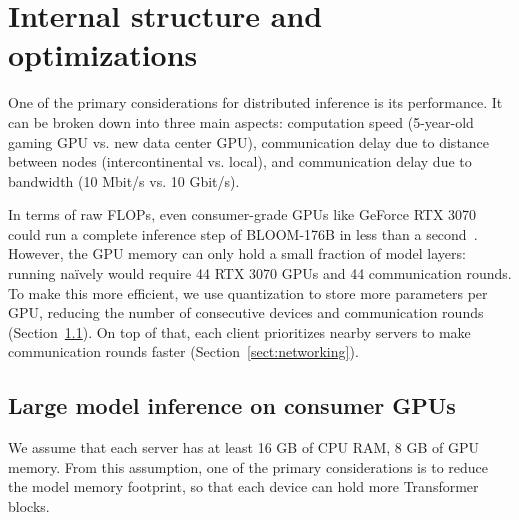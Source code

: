 \section{Internal structure and optimizations}\label{sect:internals}


One of the primary considerations for distributed inference is its performance. It can be broken down into three main aspects: computation speed (5-year-old gaming GPU vs. new data center GPU), communication delay due to distance between nodes (intercontinental vs. local), and communication delay due to bandwidth (10 Mbit/s vs. 10 Gbit/s).

In terms of raw FLOPs, even consumer-grade GPUs like GeForce RTX 3070 could run a complete inference step of BLOOM-176B in less than a second~\cite{ga102-datasheet}. However, the GPU memory can only hold a small fraction of model layers: running na\"ively would require 44 RTX 3070 GPUs and 44 communication rounds. To make this more efficient, we use quantization to store more parameters per GPU, reducing the number of consecutive devices and communication rounds (Section~\ref{sect:inside_gpu}). On top of that, each client prioritizes nearby servers to make communication rounds faster (Section~\ref{sect:networking}).



\subsection{Large model inference on consumer GPUs}\label{sect:inside_gpu}

We assume that each server has at least 16 GB of CPU RAM, 8 GB of GPU memory. From this assumption, one of the primary considerations is to reduce the model memory footprint, so that each device can hold more Transformer blocks.%

